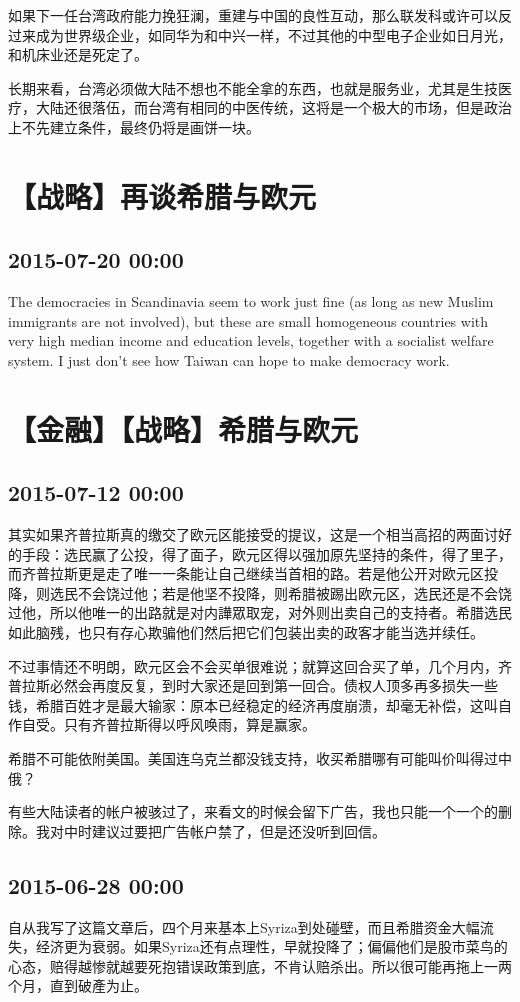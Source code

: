 \documentclass[twocolumn]{ctexart}
\begin{document}
如果下一任台湾政府能力挽狂澜，重建与中国的良性互动，那么联发科或许可以反过来成为世界级企业，如同华为和中兴一样，不过其他的中型电子企业如日月光，和机床业还是死定了。

长期来看，台湾必须做大陆不想也不能全拿的东西，也就是服务业，尤其是生技医疗，大陆还很落伍，而台湾有相同的中医传统，这将是一个极大的市场，但是政治上不先建立条件，最终仍将是画饼一块。\section*{【战略】再谈希腊与欧元}
\subsection*{2015-07-20 00:00}
The democracies in Scandinavia seem to work just fine (as long as new Muslim immigrants are not involved), but these are small homogeneous countries with very high median income and education levels, together with a socialist welfare system. I just don't see how Taiwan can hope to make democracy work.\section*{【金融】【战略】希腊与欧元}
\subsection*{2015-07-12 00:00}
其实如果齐普拉斯真的缴交了欧元区能接受的提议，这是一个相当高招的两面讨好的手段：选民赢了公投，得了面子，欧元区得以强加原先坚持的条件，得了里子，而齐普拉斯更是走了唯一一条能让自己继续当首相的路。若是他公开对欧元区投降，则选民不会饶过他；若是他坚不投降，则希腊被踢出欧元区，选民还是不会饶过他，所以他唯一的出路就是对内譁眾取宠，对外则出卖自己的支持者。希腊选民如此脑残，也只有存心欺骗他们然后把它们包装出卖的政客才能当选并续任。

不过事情还不明朗，欧元区会不会买单很难说；就算这回合买了单，几个月内，齐普拉斯必然会再度反复，到时大家还是回到第一回合。债权人顶多再多损失一些钱，希腊百姓才是最大输家：原本已经稳定的经济再度崩溃，却毫无补偿，这叫自作自受。只有齐普拉斯得以呼风唤雨，算是赢家。

希腊不可能依附美国。美国连乌克兰都没钱支持，收买希腊哪有可能叫价叫得过中俄？

有些大陆读者的帐户被骇过了，来看文的时候会留下广告，我也只能一个一个的删除。我对中时建议过要把广告帐户禁了，但是还没听到回信。\subsection*{2015-06-28 00:00}
自从我写了这篇文章后，四个月来基本上Syriza到处碰壁，而且希腊资金大幅流失，经济更为衰弱。如果Syriza还有点理性，早就投降了；偏偏他们是股市菜鸟的心态，赔得越惨就越要死抱错误政策到底，不肯认赔杀出。所以很可能再拖上一两个月，直到破產为止。
\end{document}
